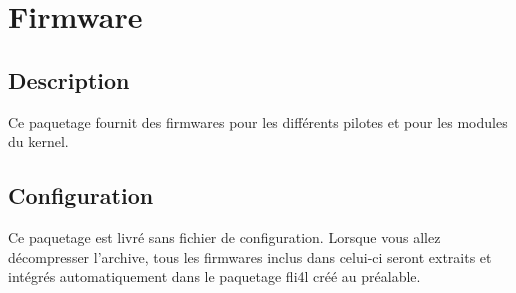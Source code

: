 {
\section {Firmware}
}

\subsection {Description}
  Ce paquetage fournit des firmwares pour les différents pilotes et pour
  les modules du kernel.\\

\subsection{Configuration}

  Ce paquetage est livré sans fichier de configuration. Lorsque vous allez
  décompresser l'archive, tous les firmwares inclus dans celui-ci seront extraits
  et intégrés automatiquement dans le paquetage fli4l créé au préalable.

